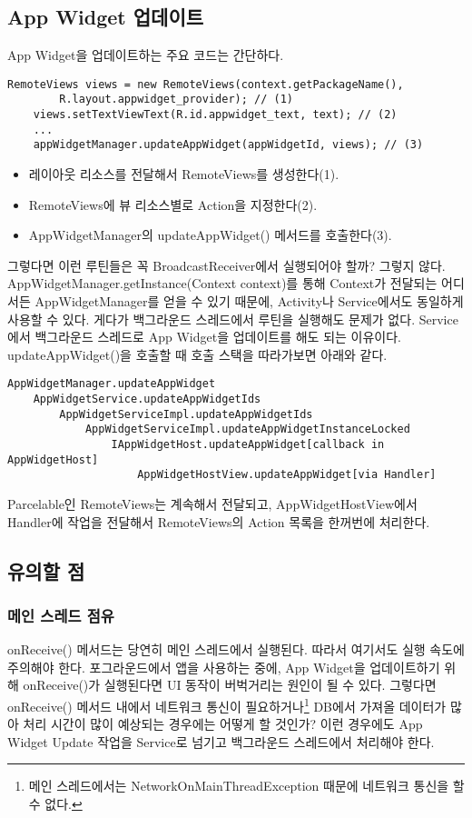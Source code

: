 \subsection{App Widget 업데이트}
App Widget을 업데이트하는 주요 코드는 간단하다.
\begin{lstlisting}[frame=single] 
	RemoteViews views = new RemoteViews(context.getPackageName(),
		R.layout.appwidget_provider); // (1)
	views.setTextViewText(R.id.appwidget_text, text); // (2)
	...
	appWidgetManager.updateAppWidget(appWidgetId, views); // (3)
\end{lstlisting}
\begin{itemize}
\item 레이아웃 리소스를 전달해서 RemoteViews를 생성한다(1).
\item RemoteViews에 뷰 리소스별로 Action을 지정한다(2).
\item AppWidgetManager의 updateAppWidget() 메서드를 호출한다(3).
\end{itemize}

그렇다면 이런 루틴들은 꼭 BroadcastReceiver에서 실행되어야 할까? 그렇지 않다. AppWidgetManager.getInstance(Context context)를 통해 Context가 전달되는 어디서든 AppWidgetManager를 얻을 수 있기 때문에, Activity나 Service에서도 동일하게 사용할 수 있다.
게다가 백그라운드 스레드에서 루틴을 실행해도 문제가 없다. Service에서 백그라운드 스레드로 App Widget을 업데이트를 해도 되는 이유이다.\\

updateAppWidget()을 호출할 때 호출 스택을 따라가보면 아래와 같다.
\begin{lstlisting}[frame=single] 
AppWidgetManager.updateAppWidget
	AppWidgetService.updateAppWidgetIds
		AppWidgetServiceImpl.updateAppWidgetIds
			AppWidgetServiceImpl.updateAppWidgetInstanceLocked
				IAppWidgetHost.updateAppWidget[callback in AppWidgetHost]
					AppWidgetHostView.updateAppWidget[via Handler]
\end{lstlisting}
Parcelable인 RemoteViews는 계속해서 전달되고, AppWidgetHostView에서 Handler에 작업을 전달해서 RemoteViews의 Action 목록을 한꺼번에 처리한다.

\subsection{유의할 점}
\subsubsection{메인 스레드 점유}
onReceive() 메서드는 당연히 메인 스레드에서 실행된다. 따라서 여기서도 실행 속도에 주의해야 한다.
포그라운드에서 앱을 사용하는 중에, App Widget을 업데이트하기 위해 onReceive()가 실행된다면 UI 동작이 버벅거리는 원인이 될 수 있다.
그렇다면 onReceive() 메서드 내에서 네트워크 통신이 필요하거나\footnote{메인 스레드에서는 NetworkOnMainThreadException 때문에 네트워크 통신을 할 수 없다.} DB에서 가져올 데이터가 많아 처리 시간이 많이 예상되는 경우에는 어떻게 할 것인가? 이런 경우에도 App Widget Update 작업을 Service로 넘기고 백그라운드 스레드에서 처리해야 한다.\\


